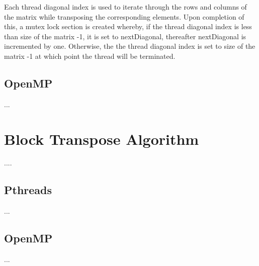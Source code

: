 \documentclass[10pt,onecolumn]{article}
\begin{document}
Each thread diagonal index is used to iterate through the rows and columns of the matrix while transposing the corresponding elements. Upon completion of this, a mutex lock section is created whereby, if the thread diagonal index is less than size of the matrix -1, it is set to nextDiagonal, thereafter nextDiagonal is incremented by one. Otherwise, the the thread diagonal index is set to size of the matrix -1 at which point the thread will be terminated. 


%
\subsection{OpenMP}
%
...
%
\section{Block Transpose Algorithm}
%
....
%
\subsection{Pthreads}
%
...
%
\subsection{OpenMP}
%
...
%
%
\end{document}
